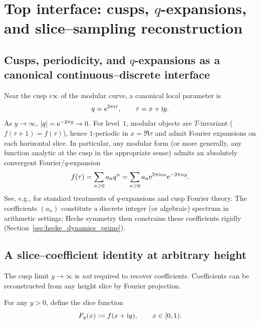 
\section{Top interface: cusps, \texorpdfstring{$q$}{q}-expansions, and slice--sampling reconstruction}
\label{sec:cusp_qexp_slice_sampling}

\subsection{Cusps, periodicity, and \texorpdfstring{$q$}{q}-expansions as a canonical continuous--discrete interface}
\label{sec:cusp_qexp_interface}

Near the cusp $i\infty$ of the modular curve, a canonical local parameter is
\begin{equation}
q=\mathrm{e}^{2\pi \mathrm{i} \tau},\qquad \tau=x+\mathrm{i} y.
\end{equation}
As $y\to\infty$, $|q|=\mathrm{e}^{-2\pi y}\to 0$. For level~$1$, modular objects are $T$-invariant ($f(\tau+1)=f(\tau)$), hence $1$-periodic in $x=\Re\tau$ and admit Fourier expansions on each horizontal slice. In particular, any modular form (or more generally, any function analytic at the cusp in the appropriate sense) admits an absolutely convergent Fourier/$q$-expansion
\begin{equation}
\label{eq:qexp_general}
f(\tau)=\sum_{n\ge 0} a_n q^n=\sum_{n\ge 0} a_n \mathrm{e}^{2\pi \mathrm{i} n x}\mathrm{e}^{-2\pi n y}.
\end{equation}
See, e.g., \cite{Apostol1990,DiamondShurman2005,Serre1973} for standard treatments of $q$-expansions and cusp Fourier theory.
The coefficients $(a_n)$ constitute a discrete integer (or algebraic) spectrum in arithmetic settings; Hecke symmetry then constrains these coefficients rigidly (Section~\ref{sec:hecke_dynamics_prime}).

\subsection{A slice--coefficient identity at arbitrary height}
\label{sec:slice_coefficient_identity}

The cusp limit $y\to\infty$ is \emph{not} required to recover coefficients. Coefficients can be reconstructed from any height slice by Fourier projection.

\begin{definition}
\label{def:height_slice}
For any $y>0$, define the slice function
\begin{equation}
F_y(x):=f(x+\mathrm{i} y),\qquad x\in[0,1).
\end{equation}
\end{definition}

